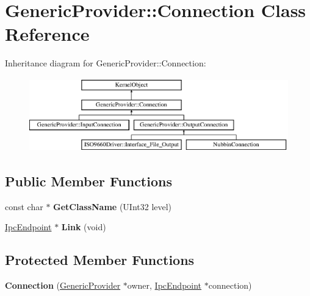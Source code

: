 \hypertarget{class_generic_provider_1_1_connection}{}\section{Generic\+Provider\+:\+:Connection Class Reference}
\label{class_generic_provider_1_1_connection}
Inheritance diagram for Generic\+Provider\+:\+:Connection\+:\begin{figure}[H]
\begin{center}
\leavevmode
\includegraphics[height=3.204578cm]{class_generic_provider_1_1_connection}
\end{center}
\end{figure}
\subsection*{Public Member Functions}
\begin{DoxyCompactItemize}
\item 
\mbox{\label{class_generic_provider_1_1_connection_a1a0e4585cc68a03139b7b6f90018c953}} 
const char $\ast$ {\bfseries Get\+Class\+Name} (U\+Int32 level)
\item 
\mbox{\label{class_generic_provider_1_1_connection_a2ca2ef660ec08ebd09e76adef06ec256}} 
\hyperlink{class_ipc_endpoint}{Ipc\+Endpoint} $\ast$ {\bfseries Link} (void)
\end{DoxyCompactItemize}
\subsection*{Protected Member Functions}
\begin{DoxyCompactItemize}
\item 
\mbox{\label{class_generic_provider_1_1_connection_a7cb415aad20366a5efea335764305d2c}} 
{\bfseries Connection} (\hyperlink{class_generic_provider}{Generic\+Provider} $\ast$owner, \hyperlink{class_ipc_endpoint}{Ipc\+Endpoint} $\ast$connection)
\end{DoxyCompactItemize}
